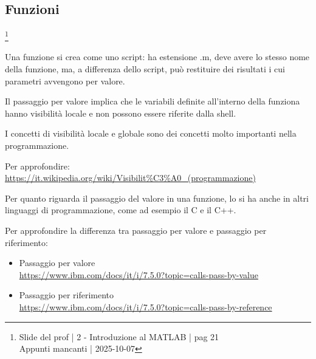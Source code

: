 \newpage 

\subsection{Funzioni}

\footnote{ 
    Slide del prof | 2 - Introduzione al MATLAB | pag 21\\
    Appunti mancanti | 2025-10-07 
}

Una funzione si crea come uno script: ha estensione .m, deve avere lo stesso nome della funzione, 
ma, a differenza dello script, può restituire dei risultati i cui parametri avvengono per valore. \newline 

Il passaggio per valore implica che le variabili definite all'interno della funziona hanno visibilità locale e non possono essere riferite dalla shell. \newline 

\begin{tcolorbox}
    I concetti di visibilità locale e globale sono dei concetti molto importanti nella programmazione. \newline 

    Per approfondire: \\\url{https://it.wikipedia.org/wiki/Visibilit%C3%A0_(programmazione)} \newline 

    Per quanto riguarda il passaggio del valore in una funzione, lo si ha anche in altri linguaggi di programmazione, come ad esempio il C e il C++. \newline 

    Per approfondire la differenza tra passaggio per valore e passaggio per riferimento: 
    
    \begin{itemize}
        \item Passaggio per valore \\ \url{https://www.ibm.com/docs/it/i/7.5.0?topic=calls-pass-by-value}
        \item Passaggio per riferimento \\ \url{https://www.ibm.com/docs/it/i/7.5.0?topic=calls-pass-by-reference}
    \end{itemize}
    
\end{tcolorbox}

